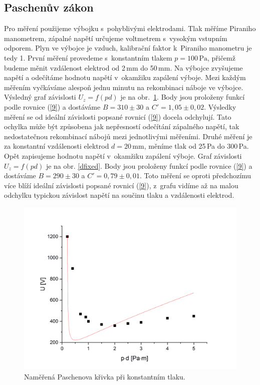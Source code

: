 \documentclass[a4paper,12pt]{article}
\begin{document}
\subsection{Paschenův zákon}
Pro měření použijeme výbojku s~pohyblivými elektrodami. Tlak měříme Piraniho 
manometrem, zápalné napětí určujeme voltmetrem s~vysokým vstupním odporem. Plyn 
ve výbojce je vzduch, kalibrační faktor k~Piraniho manometru je tedy 1. První 
měření provedeme s~konstantním tlakem $p = 100\,\si{\pascal}$, přičemž budeme 
měnit vzdálenost elektrod od 2\,\si{\milli\meter} do 50\,\si{\milli\meter}. Na 
výbojce zvyšujeme napětí a odečítáme hodnotu napětí v~okamžiku zapálení výboje. 
Mezi každým měřením vyčkáváme alespoň jednu minutu na rekombinaci náboje ve 
výbojce. Výsledný graf závislosti $U_z = f(pd)$ je na obr.~\ref{tlakfixed}. 
Body jsou proloženy funkcí podle rovnice (\ref{9}) a dostáváme $B = 310 \pm 30$ 
a $C' = 1,05 \pm 0,02$. Výsledky měření se od ideální závislosti popsané 
rovnicí (\ref{9}) docela odchylují. Tato ochylka může být způsobena jak 
nepřesností odečítání zápalného napětí, tak nedostatečnou rekombinací nábojů 
mezi jednotlivými měřeními. 
Druhé měření je za konstantní vzdálenosti elektrod $d = 20\,\si{\milli\meter}$, 
měníme tlak od 25\,\si{\pascal} do 300\,\si{\pascal}. Opět zapisujeme hodnotu 
napětí v~okamžiku zapálení výboje. Graf závislosti $U_z = f(pd)$ je na obr. 
\ref{dfixed}. Body jsou proloženy funkcí podle rovnice (\ref{9}) a dostáváme $B 
= 290 \pm 30$ a $C' = 0,79 \pm 0,01$. Toto měření se oproti předchozímu více 
blíží ideální závislosti popsané rovnicí (\ref{9}), z~grafu vidíme až na malou 
odchylku typickou závislost napětí na součinu tlaku a vzdálenosti elektrod.

\begin{figure}[h]
	\centering
	\includegraphics[width=130mm]{tlakfixed.png}
	\caption{Naměřená Paschenova křivka při konstantním tlaku.}
	\label{tlakfixed}
\end{figure}
\end{document}
